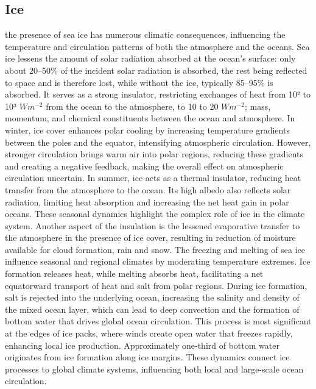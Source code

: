 \subsection{Ice}
the presence of sea ice has numerous climatic consequences, influencing the temperature and circulation patterns of both the atmosphere and the oceans. Sea ice lessens the amount of solar radiation absorbed at the ocean's surface: only about 20–50\% of the incident solar radiation is absorbed, the rest being reflected to space and is therefore lost, while without the ice, typically 85–95\% is absorbed.
It serves as a strong insulator, restricting exchanges of heat from 10² to 10³ \(Wm^{-2}\)  from the ocean to the atmosphere, to 10 to 20 \(Wm^{-2}\);   mass, momentum, and chemical constituents between the ocean and atmosphere.
\newline In winter, ice cover enhances polar cooling by increasing temperature gradients between the poles and the equator, intensifying atmospheric circulation. However, stronger circulation brings warm air into polar regions, reducing these gradients and creating a negative feedback, making the overall effect on atmospheric circulation uncertain. In summer, ice acts as a thermal insulator, reducing heat transfer from the atmosphere to the ocean. Its high albedo also reflects solar radiation, limiting heat absorption and increasing the net heat gain in polar oceans. These seasonal dynamics highlight the complex role of ice in the climate system.
Another aspect of the insulation is the lessened evaporative transfer to the atmosphere in the presence of ice cover, resulting in reduction of moisture available for cloud formation, rain and snow.
The freezing and melting of sea ice influence seasonal and regional climates by moderating temperature extremes. Ice formation releases heat, while melting absorbs heat, facilitating a net equatorward transport of heat and salt from polar regions. During ice formation, salt is rejected into the underlying ocean, increasing the salinity and density of the mixed ocean layer, which can lead to deep convection and the formation of bottom water that drives global ocean circulation.
This process is most significant at the edges of ice packs, where winds create open water that freezes rapidly, enhancing local ice production. Approximately one-third of bottom water originates from ice formation along ice margins. These dynamics connect ice processes to global climate systems, influencing both local and large-scale ocean circulation.
